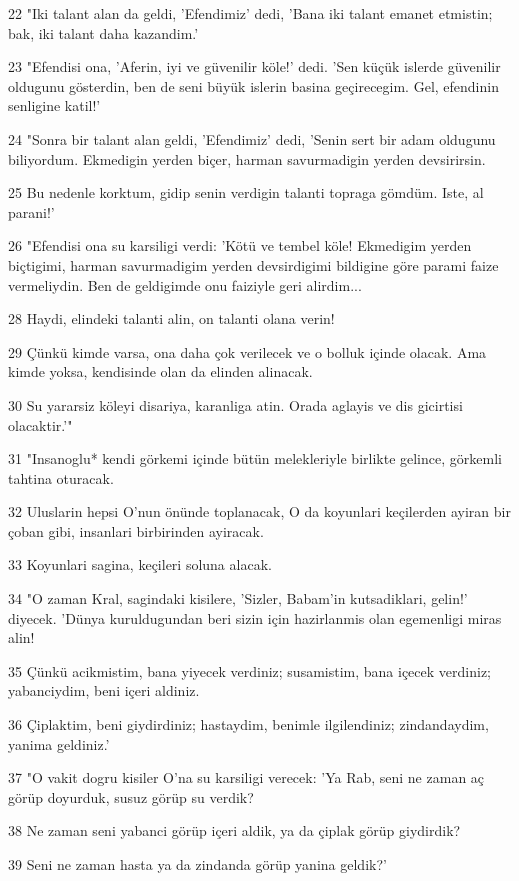 \par 22 "Iki talant alan da geldi, 'Efendimiz' dedi, 'Bana iki talant emanet etmistin; bak, iki talant daha kazandim.'
\par 23 "Efendisi ona, 'Aferin, iyi ve güvenilir köle!' dedi. 'Sen küçük islerde güvenilir oldugunu gösterdin, ben de seni büyük islerin basina geçirecegim. Gel, efendinin senligine katil!'
\par 24 "Sonra bir talant alan geldi, 'Efendimiz' dedi, 'Senin sert bir adam oldugunu biliyordum. Ekmedigin yerden biçer, harman savurmadigin yerden devsirirsin.
\par 25 Bu nedenle korktum, gidip senin verdigin talanti topraga gömdüm. Iste, al parani!'
\par 26 "Efendisi ona su karsiligi verdi: 'Kötü ve tembel köle! Ekmedigim yerden biçtigimi, harman savurmadigim yerden devsirdigimi bildigine göre parami faize vermeliydin. Ben de geldigimde onu faiziyle geri alirdim...
\par 28 Haydi, elindeki talanti alin, on talanti olana verin!
\par 29 Çünkü kimde varsa, ona daha çok verilecek ve o bolluk içinde olacak. Ama kimde yoksa, kendisinde olan da elinden alinacak.
\par 30 Su yararsiz köleyi disariya, karanliga atin. Orada aglayis ve dis gicirtisi olacaktir.'"
\par 31 "Insanoglu* kendi görkemi içinde bütün melekleriyle birlikte gelince, görkemli tahtina oturacak.
\par 32 Uluslarin hepsi O'nun önünde toplanacak, O da koyunlari keçilerden ayiran bir çoban gibi, insanlari birbirinden ayiracak.
\par 33 Koyunlari sagina, keçileri soluna alacak.
\par 34 "O zaman Kral, sagindaki kisilere, 'Sizler, Babam'in kutsadiklari, gelin!' diyecek. 'Dünya kuruldugundan beri sizin için hazirlanmis olan egemenligi miras alin!
\par 35 Çünkü acikmistim, bana yiyecek verdiniz; susamistim, bana içecek verdiniz; yabanciydim, beni içeri aldiniz.
\par 36 Çiplaktim, beni giydirdiniz; hastaydim, benimle ilgilendiniz; zindandaydim, yanima geldiniz.'
\par 37 "O vakit dogru kisiler O'na su karsiligi verecek: 'Ya Rab, seni ne zaman aç görüp doyurduk, susuz görüp su verdik?
\par 38 Ne zaman seni yabanci görüp içeri aldik, ya da çiplak görüp giydirdik?
\par 39 Seni ne zaman hasta ya da zindanda görüp yanina geldik?'
